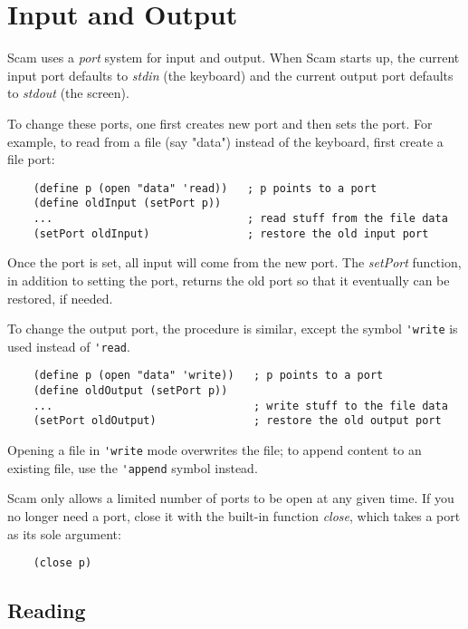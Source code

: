 \chapter{Input and Output}
\label{InputAndOutput}

Scam uses a {\it port} system for input and output.
When Scam starts up, the current input port defaults to
{\it stdin} (the keyboard) and the current output
port defaults to {\it stdout} (the screen).

To change these ports, one first creates new port
and then sets the port.
For example, to read from a file (say "data")
instead of the keyboard,
first create a file port:

\begin{verbatim}
    (define p (open "data" 'read))   ; p points to a port
    (define oldInput (setPort p))
    ...                              ; read stuff from the file data
    (setPort oldInput)               ; restore the old input port
\end{verbatim}

Once the port is set, all input will come from the new port.
The {\it setPort} function, in addition to setting the port, returns
the old port so that it eventually can be restored, if needed.

To change the output port, the procedure is similar, except
the symbol \verb!'write! is used instead of \verb!'read!.

\begin{verbatim}
    (define p (open "data" 'write))   ; p points to a port
    (define oldOutput (setPort p))
    ...                               ; write stuff to the file data
    (setPort oldOutput)               ; restore the old output port
\end{verbatim}

Opening a file in \verb!'write! mode overwrites the file;
to append content to an existing file, use the \verb!'append!
symbol instead.

Scam only allows a limited number of ports to be open at
any given time. If you no longer need a port, close it with
the built-in function {\it close}, which takes a port as its
sole argument:

\begin{verbatim}
    (close p)
\end{verbatim}

\section{Reading}

